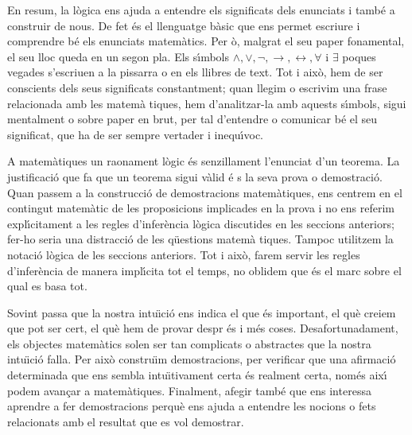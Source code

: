 En resum, la l\`{o}gica ens ajuda a entendre els significats dels enunciats
i tamb\'{e} a construir de nous. De fet \'{e}s el llenguatge b\`{a}sic que
ens permet escriure i comprendre b\'{e} els enunciats matem\`{a}tics. Per%
\`{o}, malgrat el seu paper fonamental, el seu lloc queda en un segon pla.
Els s\'{\i}mbols $\wedge,\vee,\lnot,\longrightarrow,\longleftrightarrow,%
\forall$ i $\exists$ poques vegades s'escriuen a la pissarra o en els
llibres de text. Tot i aix\`{o}, hem de ser conscients dels seus significats
constantment; quan llegim o escrivim una frase relacionada amb les matem\`{a}%
tiques, hem d'analitzar-la amb aquests s\'{\i}mbols, sigui mentalment o
sobre paper en brut, per tal d'entendre o comunicar b\'{e} el seu
significat, que ha de ser sempre vertader i inequ\'{\i}voc.

\bigskip

A matem\`{a}tiques un raonament l\`{o}gic \'{e}s senzillament l'enunciat
d'un teorema. La justificaci\'{o} que fa que un teorema sigui v\`{a}lid \'{e}%
s la seva prova o demostraci\'{o}. Quan passem a la construcci\'{o} de
demostracions matem\`{a}tiques, ens centrem en el contingut matem\`{a}tic de
les proposicions implicades en la prova i no ens referim expl\'{\i}citament
a les regles d'infer\`{e}ncia l\`{o}gica discutides en les seccions
anteriors; fer-ho seria una distracci\'{o} de les q\"{u}estions matem\`{a}%
tiques. Tampoc utilitzem la notaci\'{o} l\`{o}gica de les seccions
anteriors. Tot i aix\`{o}, farem servir les regles d'infer\`{e}ncia de
manera impl\'{\i}cita tot el temps, no oblidem que \'{e}s el marc sobre el
qual es basa tot.

Sovint passa que la nostra intu\"{\i}ci\'{o} ens indica el que \'{e}s
important, el qu\`{e} creiem que pot ser cert, el qu\`{e} hem de provar despr%
\'{e}s i m\'{e}s coses. Desafortunadament, els objectes matem\`{a}tics solen
ser tan complicats o abstractes que la nostra intu\"{\i}ci\'{o} falla. Per
aix\`{o} constru\"{\i}m demostracions, per verificar que una afirmaci\'{o}
determinada que ens sembla intu\"{\i}tivament certa \'{e}s realment certa,
nom\'{e}s aix\'{\i} podem avan\c{c}ar a matem\`{a}tiques. Finalment, afegir
tamb\'{e} que ens interessa aprendre a fer demostracions perqu\`{e} ens
ajuda a entendre les nocions o fets relacionats amb el resultat que es vol
demostrar.

\bigskip


